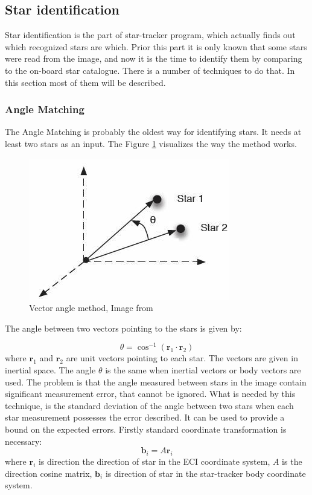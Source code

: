 \documentclass[12pt,a4paper,twoside]{article}
\begin{document}
\subsection{Star identification}

Star identification is the part of star-tracker program, which actually finds out which recognized stars are which. Prior this part it is only known that some stars were read from the image, and now it is the time to identify them by comparing to the on-board star catalogue. There is a number of techniques to do that\cite{spratling2009survey}. In this section most of them will be described.


\subsubsection{Angle Matching}
The Angle Matching is probably the oldest way for identifying stars. It needs at least two stars as an input\cite{gottlieb1978star}. The Figure \ref{fig:angle_matching} visualizes the way the method works.

\begin{figure}[ht]
\includegraphics[scale=0.7]{vector_angle_method.jpg}
\centering
\caption[Vector angle method]{Vector angle method, Image from \citet{gottlieb1978star}}
\label{fig:angle_matching}
\end{figure}

The angle between two vectors pointing to the stars is given by:

\begin{equation}
\theta = \cos^{-1}(\bm{r}_1 \cdot \bm{r}_2)
\end{equation}
where $\bm{r}_1$ and $\bm{r}_2$ are unit vectors pointing to each star. The vectors are given in inertial space. The angle $\theta$ is the same when inertial vectors or body vectors are used. The problem is that the angle measured between stars in the image contain significant measurement error, that cannot be ignored.
What is needed by this technique, is the standard deviation of the angle between two stars when each star measurement possesses the error described. It can be used to provide a bound on the expected errors.
Firstly standard coordinate transformation is necessary:
\begin{equation}
\bm{b}_i = A\bm{r}_i
\end{equation}
where $\bm{r}_i$ is direction the direction of star in the ECI coordinate system, $A$ is the direction cosine matrix, $\bm{b}_i$ is direction of star in the star-tracker body coordinate system.
\end{document}
